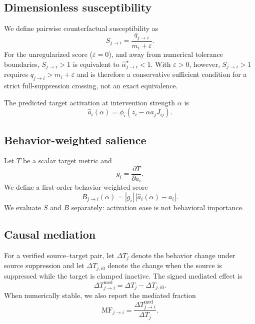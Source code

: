 \subsection{Dimensionless susceptibility}

We define pairwise counterfactual susceptibility as
\begin{equation}
    S_{j\rightarrow i}
    =\frac{q_{j\rightarrow i}}{m_i+\varepsilon}.
    \label{eq:susceptibility}
\end{equation}
For the unregularized score ($\varepsilon=0$), and away from numerical tolerance
boundaries, $S_{j\rightarrow i}>1$ is equivalent to
$\widehat\alpha^\star_{j\rightarrow i}<1$. With $\varepsilon>0$, however,
$S_{j\rightarrow i}>1$ requires $q_{j\rightarrow i}>m_i+\varepsilon$ and is
therefore a conservative sufficient condition for a strict full-suppression
crossing, not an exact equivalence.

The predicted target activation at intervention strength $\alpha$ is
\begin{equation}
    \widehat a_i(\alpha)
    =\phi_i\!\left(z_i-\alpha a_jJ_{ij}\right).
\end{equation}

\subsection{Behavior-weighted salience}

Let $T$ be a scalar target metric and
\begin{equation}
    g_i=\frac{\partial T}{\partial a_i}.
\end{equation}
We define a first-order behavior-weighted score
\begin{equation}
    B_{j\rightarrow i}(\alpha)
    =|g_i|\,|\widehat a_i(\alpha)-a_i|.
\end{equation}
We evaluate $S$ and $B$ separately: activation ease is not behavioral importance.

\subsection{Causal mediation}

For a verified source--target pair, let $\Delta T_j$ denote the behavior change under source suppression and let $\Delta T_{j,i0}$ denote the change when the source is suppressed while the target is clamped inactive. The signed mediated effect is
\begin{equation}
    \Delta T^{\mathrm{med}}_{j\rightarrow i}
    =\Delta T_j-\Delta T_{j,i0}.
\end{equation}
When numerically stable, we also report the mediated fraction
\begin{equation}
    \mathrm{MF}_{j\rightarrow i}
    =\frac{\Delta T^{\mathrm{med}}_{j\rightarrow i}}{\Delta T_j}.
\end{equation}

